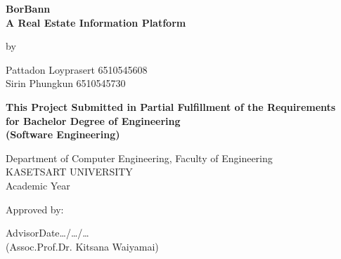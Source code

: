 \thispagestyle{empty}
\begin{center}
{\Large \textbf{BorBann\\A Real Estate Information Platform}}

\vspace{1cm}
{\large by}

\vspace{0.5cm}
{\large Pattadon Loyprasert 6510545608\\
Sirin Phungkun 6510545730}

\vspace{2cm}
{\large \textbf{This Project Submitted in Partial Fulfillment of the Requirements\\
for Bachelor Degree of Engineering\\
(Software Engineering)}}

\vspace{0.5cm}
{\large Department of Computer Engineering, Faculty of Engineering\\
KASETSART UNIVERSITY\\
Academic Year \graduationyear}
\end{center}

\vspace{3cm}
\noindent Approved by:

\vspace{1.5cm}
\noindent Advisor\dotfill Date\dots{}/\dots{}/\dots{}\\
\indent(Assoc.Prof.Dr. Kitsana Waiyamai)


\clearpage
